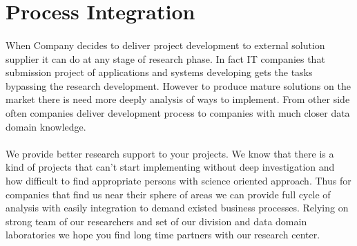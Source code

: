 \documentclass[11pt]{article}
\begin{document}
\section*{Process Integration}
\paragraph{}
When Company decides to deliver project development to external solution supplier it can do at any stage of research phase. In fact IT companies that submission project of applications and systems developing gets the tasks bypassing the research development. However to produce mature solutions on the market there is need more deeply analysis of ways to implement. From other side often companies deliver development process to companies with much closer data domain knowledge.
\paragraph{}
We provide better research support to your projects. We know that there is a kind of projects that can't start implementing without deep investigation and how difficult to find appropriate persons with science oriented approach. Thus for companies that find us near their sphere of areas we can provide full cycle of analysis with easily integration to demand existed business processes. Relying on strong team of our researchers and set of our division and data domain laboratories we hope you find long time partners with our research center.

\end{document}
